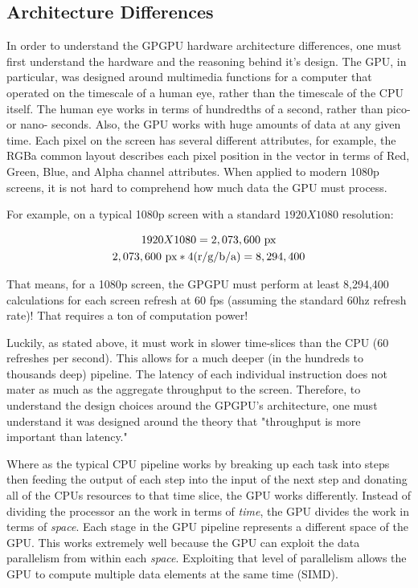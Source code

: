 \subsection*{Architecture Differences}

In order to understand the GPGPU hardware architecture differences, one must first understand the hardware and the reasoning behind it's design. The GPU, in particular, was designed around multimedia functions for a computer that operated on the timescale of a human eye, rather than the timescale of the CPU itself. The human eye works in terms of hundredths of a second, rather than pico- or nano- seconds. Also, the GPU works with huge amounts of data at any given time. Each pixel on the screen has several different attributes, for example, the RGBa common layout describes each pixel position in the vector in terms of Red, Green, Blue, and Alpha channel attributes. When applied to modern 1080p screens, it is not hard to comprehend how much data the GPU must process. \cite{gpucomputing}

For example, on a typical 1080p screen with a standard $1920 X 1080$ resolution:
\begin{center}
\begin{gather}
1920 X 1080 = 2,073,600 \text{ px} \notag \\
2,073,600 \text{ px} * 4 \text{(r/g/b/a)} =  8,294,400 \notag
\end{gather}
\end{center}

That means, for a 1080p screen, the GPGPU must perform at least 8,294,400 calculations for each screen refresh at 60 fps (assuming the standard 60hz refresh rate)! That requires a ton of computation power! 

Luckily, as stated above, it must work in slower time-slices than the CPU (60 refreshes per second). This allows for a much deeper (in the hundreds to thousands deep) pipeline. The latency of each individual instruction does not mater as much as the aggregate throughput to the screen. Therefore, to understand the design choices around the GPGPU's architecture, one must understand it was designed around the theory that "throughput is more important than latency." \cite{gpucomputing}

Where as the typical CPU pipeline works by breaking up each task into steps then feeding the output of each step into the input of the next step and donating all of the CPUs resources to that time slice, the GPU works differently. Instead of dividing the processor an the work in terms of \textit{time}, the GPU divides the work in terms of \textit{space}. Each stage in the GPU pipeline represents a different space of the GPU. This works extremely well because the GPU can exploit the data parallelism from within each \textit{space}. \cite{gpucomputing} Exploiting that level of parallelism allows the GPU to compute multiple data elements at the same time (SIMD). 

